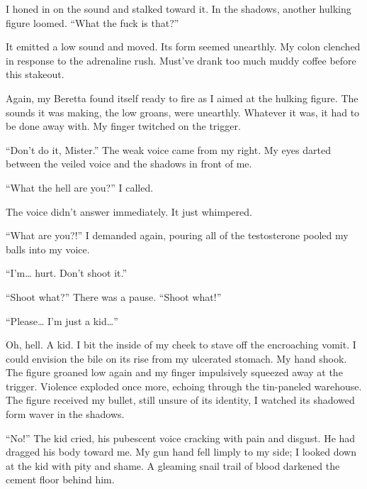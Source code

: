 I honed in on the sound and stalked toward it. In the shadows,
another hulking figure loomed. ``What the fuck is
that?''



It emitted a low sound and moved. Its form seemed unearthly. My
colon clenched in response to the adrenaline rush. Must've drank
too much muddy coffee before this stakeout.



Again, my Beretta found itself ready to fire as I aimed at the
hulking figure. The sounds it was making, the low groans, were
unearthly. Whatever it was, it had to be done away with. My finger
twitched on the trigger.



``Don't do it, Mister.'' The weak voice came from my
right. My eyes darted between the veiled voice and the shadows in
front of me.



``What the hell are you?'' I called.



The voice didn't answer immediately. It just whimpered.



``What are you?!'' I demanded again, pouring all of the
testosterone pooled my balls into my voice.



``I'm{\ldots} hurt. Don't shoot it.''



``Shoot what?'' There was a pause. ``Shoot
what!''



``Please{\ldots} I'm just a kid{\ldots}''



Oh, hell. A kid. I bit the inside of my cheek to stave off the
encroaching vomit. I could envision the bile on its rise from my
ulcerated stomach. My hand shook. The figure groaned low again and
my finger impulsively squeezed away at the trigger. Violence
exploded once more, echoing through the tin-paneled warehouse. The
figure received my bullet, still unsure of its identity, I watched
its shadowed form waver in the shadows.



``No!'' The kid cried, his pubescent voice cracking with
pain and disgust. He had dragged his body toward me. My gun hand
fell limply to my side; I looked down at the kid with pity and
shame. A gleaming snail trail of blood darkened the cement floor
behind him.



